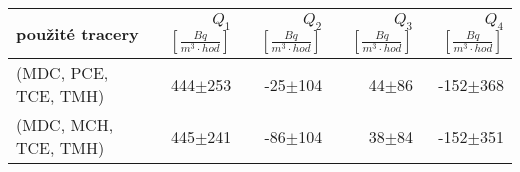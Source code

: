 \begin{tabular}{lrrrr}
\toprule
použité tracery & $Q_1$ $\left[\si{\frac{Bq}{m^3\cdot hod}}\right]$ & $Q_2$ $\left[\si{\frac{Bq}{m^3\cdot hod}}\right]$ & $Q_3$ $\left[\si{\frac{Bq}{m^3\cdot hod}}\right]$ & $Q_4$ $\left[\si{\frac{Bq}{m^3\cdot hod}}\right]$ \\
\midrule
(MDC, PCE, TCE, TMH) & 444$\pm$253 & -25$\pm$104 & 44$\pm$86 & -152$\pm$368 \\
(MDC, MCH, TCE, TMH) & 445$\pm$241 & -86$\pm$104 & 38$\pm$84 & -152$\pm$351 \\
\bottomrule
\end{tabular}
